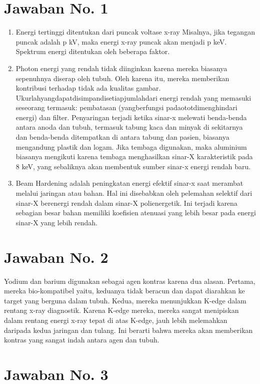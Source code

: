 \section{Jawaban No. 1}
\begin{enumerate}
\item Energi tertinggi ditentukan dari puncak voltase x-ray Misalnya, jika tegangan puncak adalah p kV, maka energi x-ray puncak akan menjadi p keV. Spektrum energi ditentukan oleh beberapa faktor. 
\item Photon energi yang rendah tidak diinginkan karena mereka biasanya sepenuhnya diserap oleh tubuh. Oleh karena itu, mereka memberikan kontribusi terhadap tidak ada kualitas gambar. Ukurlahyangdapatdisimpandisetiapjumlahdari energi rendah yang memasuki seseorang termasuk: pembatasan (yangberfungsi padaototdimenghindari energi) dan filter. Penyaringan terjadi ketika sinar-x melewati benda-benda antara anoda dan tubuh, termasuk tabung kaca dan minyak di sekitarnya dan benda-benda ditempatkan di antara tabung dan pasien, biasanya mengandung plastik dan logam. Jika tembaga digunakan, maka aluminium biasanya mengikuti karena tembaga menghasilkan sinar-X karakteristik pada 8 keV, yang sebaliknya akan membentuk sumber sinar-x energi rendah baru.
\item Beam Hardening adalah peningkatan energi efektif sinar-x saat merambat melalui jaringan atau bahan. Hal ini disebabkan oleh pelemahan selektif dari sinar-X berenergi rendah dalam sinar-X polienergetik. Ini terjadi karena sebagian besar bahan memiliki koefisien atenuasi yang lebih besar pada energi sinar-X yang lebih rendah.
\end{enumerate}

\section{Jawaban No. 2}
Yodium dan barium digunakan sebagai agen kontras karena dua alasan. Pertama, mereka bio-kompatibel yaitu, keduanya tidak beracun dan dapat diarahkan ke target yang berguna dalam tubuh. Kedua, mereka menunjukkan K-edge dalam rentang x-ray diagnostik. Karena K-edge mereka, mereka sangat menipiskan dalam rentang energi x-ray tepat di atas K-edge, jauh lebih melemahkan daripada kedua jaringan dan tulang. Ini berarti bahwa mereka akan memberikan kontras yang sangat indah antara agen dan tubuh.

\section{Jawaban No. 3}
